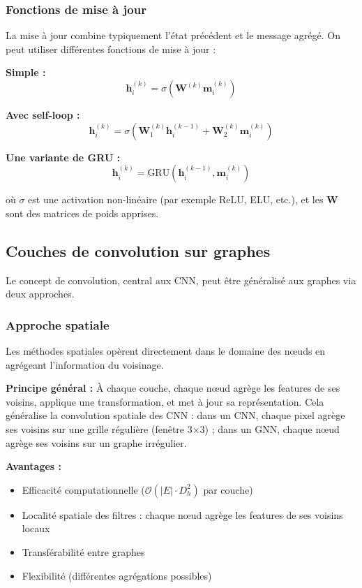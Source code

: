 \subsubsection{Fonctions de mise à jour}

La mise à jour combine typiquement l'état précédent et le message agrégé. On peut utiliser différentes fonctions de mise à jour :

\textbf{Simple :}
\[
\mathbf{h}_i^{(k)} = \sigma\left(\mathbf{W}^{(k)} \mathbf{m}_i^{(k)}\right)
\]

\textbf{Avec self-loop :}
\[
\mathbf{h}_i^{(k)} = \sigma\left(\mathbf{W}_1^{(k)} \mathbf{h}_i^{(k-1)} + \mathbf{W}_2^{(k)} \mathbf{m}_i^{(k)}\right)
\]

\textbf{Une variante de GRU :}
\[
\mathbf{h}_i^{(k)} = \text{GRU}\left(\mathbf{h}_i^{(k-1)}, \mathbf{m}_i^{(k)}\right)
\]

où $\sigma$ est une activation non-linéaire (par exemple ReLU, ELU, etc.), et les $\mathbf{W}$ sont des matrices de poids apprises.

\subsection{Couches de convolution sur graphes}

Le concept de convolution, central aux CNN, peut être généralisé aux graphes via deux approches.

\subsubsection{Approche spatiale}

Les méthodes spatiales opèrent directement dans le domaine des nœuds en agrégeant l'information du voisinage.

\textbf{Principe général :}
À chaque couche, chaque nœud agrège les features de ses voisins, applique une transformation, et met à jour sa représentation. Cela généralise la convolution spatiale des CNN : dans un CNN, chaque pixel agrège ses voisins sur une grille régulière (fenêtre 3×3) ; dans un GNN, chaque nœud agrège ses voisins sur un graphe irrégulier.

\textbf{Avantages :}
\begin{itemize}
    \item Efficacité computationnelle ($\mathcal{O}(|E| \cdot D_h^2)$ par couche)
    \item Localité spatiale des filtres : chaque nœud agrège les features de ses voisins locaux
    \item Transférabilité entre graphes
    \item Flexibilité (différentes agrégations possibles)
\end{itemize}

